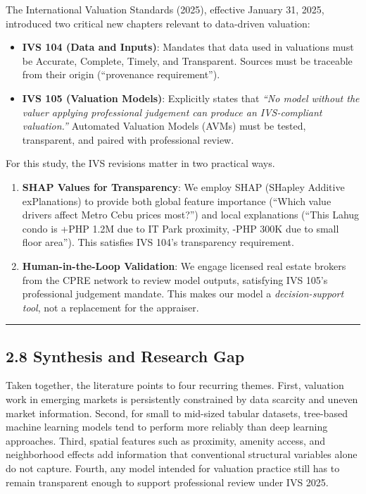 The International Valuation Standards (2025), effective January 31, 2025, introduced two critical new chapters relevant to data-driven valuation:

\begin{itemize}
\item \textbf{IVS 104 (Data and Inputs)}: Mandates that data used in valuations must be Accurate, Complete, Timely, and Transparent. Sources must be traceable from their origin (``provenance requirement'').
\item \textbf{IVS 105 (Valuation Models)}: Explicitly states that \emph{``No model without the valuer applying professional judgement can produce an IVS-compliant valuation.''} Automated Valuation Models (AVMs) must be tested, transparent, and paired with professional review.
\end{itemize}

For this study, the IVS revisions matter in two practical ways.

\begin{enumerate}
\item \textbf{SHAP Values for Transparency}: We employ SHAP (SHapley Additive exPlanations) to provide both global feature importance (``Which value drivers affect Metro Cebu prices most?'') and local explanations (``This Lahug condo is +PHP 1.2M due to IT Park proximity, -PHP 300K due to small floor area''). This satisfies IVS 104's transparency requirement.
\item \textbf{Human-in-the-Loop Validation}: We engage licensed real estate brokers from the CPRE network to review model outputs, satisfying IVS 105's professional judgement mandate. This makes our model a \emph{decision-support tool}, not a replacement for the appraiser.
\end{enumerate}

\begin{center}\rule{0.5\linewidth}{0.5pt}\end{center}

\subsection{\texorpdfstring{\textbf{2.8 Synthesis and Research Gap}}{2.8 Synthesis and Research Gap}}\label{synthesis-and-research-gap}

Taken together, the literature points to four recurring themes. First, valuation work in emerging markets is persistently constrained by data scarcity and uneven market information. Second, for small to mid-sized tabular datasets, tree-based machine learning models tend to perform more reliably than deep learning approaches. Third, spatial features such as proximity, amenity access, and neighborhood effects add information that conventional structural variables alone do not capture. Fourth, any model intended for valuation practice still has to remain transparent enough to support professional review under IVS 2025.

